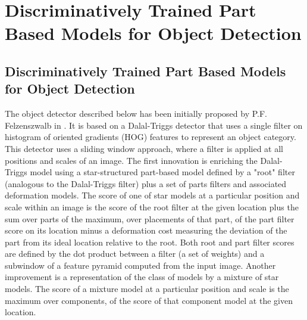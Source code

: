 \ifC

\section{Discriminatively Trained Part Based Models for Object Detection}

\subsection{Discriminatively Trained Part Based Models for Object Detection}

The object detector described below has been initially proposed by
P.F. Felzenszwalb in .  It is based on a
Dalal-Triggs detector that uses a single filter on histogram of
oriented gradients (HOG) features to represent an object category.
This detector uses a sliding window approach, where a filter is
applied at all positions and scales of an image. The first
innovation is enriching the Dalal-Triggs model using a
star-structured part-based model defined by a "root" filter
(analogous to the Dalal-Triggs filter) plus a set of parts filters
and associated deformation models. The score of one of star models
at a particular position and scale within an image is the score of
the root filter at the given location plus the sum over parts of the
maximum, over placements of that part, of the part filter score on
its location minus a deformation cost measuring the deviation of the
part from its ideal location relative to the root. Both root and
part filter scores are defined by the dot product between a filter
(a set of weights) and a subwindow of a feature pyramid computed
from the input image. Another improvement is a representation of the
class of models by a mixture of star models. The score of a mixture
model at a particular position and scale is the maximum over
components, of the score of that component model at the given
location.

\fi

\ifC


